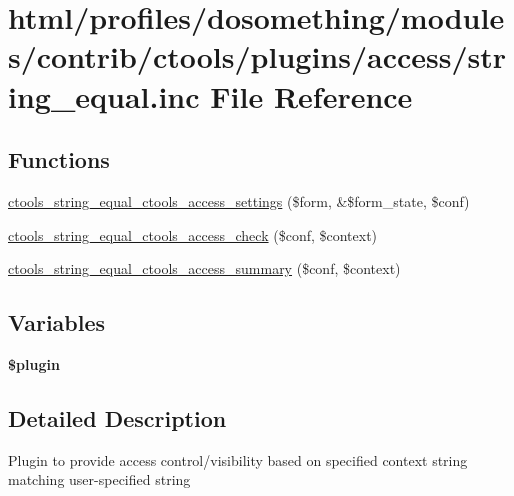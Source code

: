 \hypertarget{string__equal_8inc}{
\section{html/profiles/dosomething/modules/contrib/ctools/plugins/access/string\_\-equal.inc File Reference}
\label{string__equal_8inc}
}
\subsection*{Functions}
\begin{DoxyCompactItemize}
\item 
\hyperlink{string__equal_8inc_ad25554695ff67f2e70e5ebdacb697ce1}{ctools\_\-string\_\-equal\_\-ctools\_\-access\_\-settings} (\$form, \&\$form\_\-state, \$conf)
\item 
\hyperlink{string__equal_8inc_a15c6eeda44956dc5be2612f88e1ff25d}{ctools\_\-string\_\-equal\_\-ctools\_\-access\_\-check} (\$conf, \$context)
\item 
\hyperlink{string__equal_8inc_a374182c2a72d43ea8e975402710b5504}{ctools\_\-string\_\-equal\_\-ctools\_\-access\_\-summary} (\$conf, \$context)
\end{DoxyCompactItemize}
\subsection*{Variables}
\begin{DoxyCompactItemize}
\item 
{\bfseries \$plugin}
\end{DoxyCompactItemize}


\subsection{Detailed Description}
Plugin to provide access control/visibility based on specified context string matching user-\/specified string 

